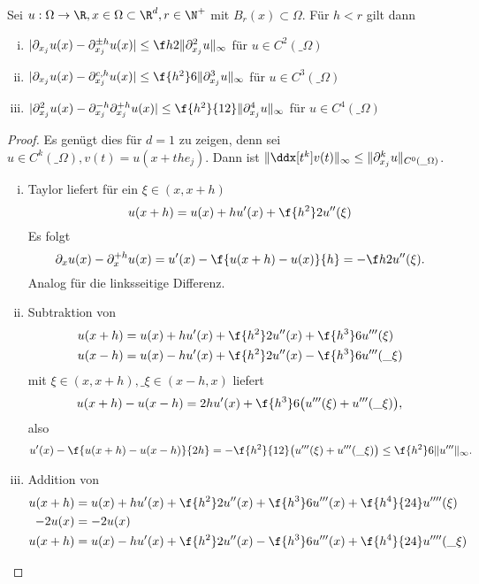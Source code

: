 \begin{st}[Approximationsgüte] \label{2.2}
	Sei $u: \Omega \to \R, x \in \Omega \subset \R^d, r \in \N^+$ mit $B_r(x) \subset \Omega$.
	Für $h < r$ gilt dann
	\begin{enumerate}[i)]
		\item
			$|\partial_{x_j} u(x) - \partial_{x_j}^{\pm h} u(x)| \le \f h2 \|\partial_{x_j}^2 u\|_\infty$ für $u \in C^2(\_\Omega)$
		\item
			$|\partial_{x_j} u(x) - \partial_{x_j}^{c, h} u(x)| \le \f {h^2}6 \|\partial_{x_j}^3 u\|_\infty$ für $u \in C^3(\_\Omega)$
		\item
			$|\partial_{x_j}^2 u(x) - \partial_{x_j}^{-h} \partial_{x_j}^{+h} u(x)| \le \f {h^2}{12} \|\partial_{x_j}^4 u\|_\infty$ für $u \in C^4(\_\Omega)$
	\end{enumerate}
	\begin{proof}
		Es genügt dies für $d = 1$ zu zeigen, denn  sei $u \in C^k(\_\Omega), v(t) = u(x + th e_j)$.
		Dann ist $\|\ddx[t^k] v(t)\|_\infty \le \|\partial_{x_j}^k u\|_{C^0(\_\Omega)}$.
		\begin{enumerate}[i)]
			\item
				Taylor liefert für ein $\xi \in (x, x + h)$
				\[
					u(x+h) = u(x) + hu'(x) + \f {h^2}2 u''(\xi)
				\]
				Es folgt
				\[
					\partial_x u(x) - \partial_x^{+h} u(x)
					= u'(x) - \f{u(x+h) - u(x)}{h}
					= - \f h2 u''(\xi).
				\]
				Analog für die linksseitige Differenz.
			\item
				Subtraktion von
				\begin{align*}
					u(x+h) &= u(x) + hu'(x) + \f {h^2}2 u''(x) + \f {h^3}6 u'''(\xi) \\
					u(x-h) &= u(x) - hu'(x) + \f {h^2}2 u''(x) - \f {h^3}6 u'''(\_\xi) \\
				\end{align*}
				mit $\xi \in (x,x+h), \_\xi \in (x-h,x)$ liefert
				\[
					u(x+h) - u(x-h) = 2h u'(x) + \f{h^3}6 \big(u'''(\xi) + u'''(\_\xi)\big),
				\]
				also
				\[
					u'(x) - \f{u(x+h) - u(x-h)}{2h}
					= - \f{h^2}{12} \big( u'''(\xi) + u'''(\_\xi) \big)
					\le \f{h^2}6 \|u'''\|_\infty.
				\]
			\item
				Addition von
				\begin{align*}
					u(x+h) &= u(x) + hu'(x) + \f{h^2}2 u''(x) + \f {h^3}6 u'''(x) + \f{h^4}{24} u''''(\xi) \\
					-2u(x) &= -2u(x) \\
					u(x+h) &= u(x) - hu'(x) + \f{h^2}2 u''(x) - \f {h^3}6 u'''(x) + \f{h^4}{24} u''''(\_\xi) \\

\end{align*}
\end{enumerate}
\end{proof}
\end{st}
